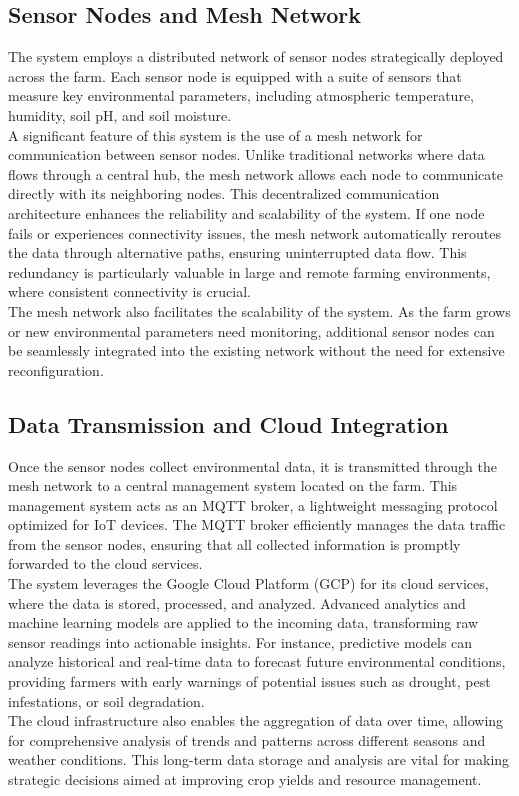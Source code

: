 \documentclass[12pt, a4paper]{article}
\begin{document}
\subsection{Sensor Nodes and Mesh Network}
The system employs a distributed network of sensor nodes strategically deployed across the farm. Each sensor node is equipped with a suite of sensors that measure key environmental parameters, including atmospheric temperature, humidity, soil pH, and soil moisture.\\
A significant feature of this system is the use of a mesh network for communication between sensor nodes. Unlike traditional networks where data flows through a central hub, the mesh network allows each node to communicate directly with its neighboring nodes. This decentralized communication architecture enhances the reliability and scalability of the system. If one node fails or experiences connectivity issues, the mesh network automatically reroutes the data through alternative paths, ensuring uninterrupted data flow. This redundancy is particularly valuable in large and remote farming environments, where consistent connectivity is crucial.\\
The mesh network also facilitates the scalability of the system. As the farm grows or new environmental parameters need monitoring, additional sensor nodes can be seamlessly integrated into the existing network without the need for extensive reconfiguration.

\subsection{Data Transmission and Cloud Integration}
Once the sensor nodes collect environmental data, it is transmitted through the mesh network to a central management system located on the farm. This management system acts as an MQTT broker, a lightweight messaging protocol optimized for IoT devices. The MQTT broker efficiently manages the data traffic from the sensor nodes, ensuring that all collected information is promptly forwarded to the cloud services.\\
The system leverages the Google Cloud Platform (GCP) for its cloud services, where the data is stored, processed, and analyzed. Advanced analytics and machine learning models are applied to the incoming data, transforming raw sensor readings into actionable insights. For instance, predictive models can analyze historical and real-time data to forecast future environmental conditions, providing farmers with early warnings of potential issues such as drought, pest infestations, or soil degradation.\\
The cloud infrastructure also enables the aggregation of data over time, allowing for comprehensive analysis of trends and patterns across different seasons and weather conditions. This long-term data storage and analysis are vital for making strategic decisions aimed at improving crop yields and resource management.
\end{document}
